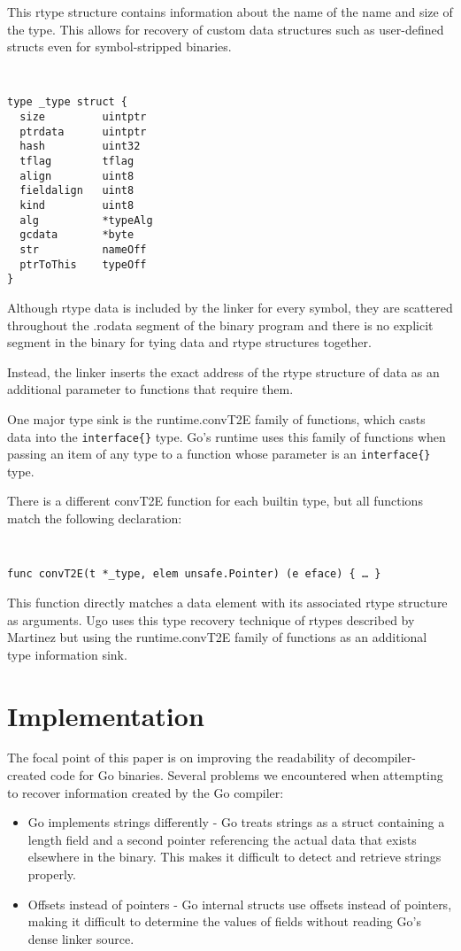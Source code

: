 \documentclass[letterpaper,twocolumn,10pt]{article}
\begin{document}
This rtype structure contains information about the name of the name and size of the type. This allows for recovery of custom data structures such as user-defined structs even for symbol-stripped binaries.
{\tt \small
\begin{verbatim}
type _type struct {
  size         uintptr
  ptrdata      uintptr
  hash         uint32
  tflag        tflag
  align        uint8
  fieldalign   uint8
  kind         uint8
  alg          *typeAlg
  gcdata       *byte
  str          nameOff
  ptrToThis    typeOff
}
\end{verbatim}
}

Although rtype data is included by the linker for every symbol, they are scattered throughout the .rodata segment of the binary program and there is no explicit segment in the binary for tying data and rtype structures together.

Instead, the linker inserts the exact address of the rtype structure of data as an additional parameter to functions that require them.

One major type sink is the runtime.convT2E family of functions, which casts data into the \texttt{interface\{\}} type. Go’s runtime uses this family of functions when passing an item of any type to a function whose parameter is an \texttt{interface\{\}} type.

    There is a different convT2E function for each builtin type, but all functions match the following declaration:

{\tt \small
\begin{verbatim}
func convT2E(t *_type, elem unsafe.Pointer) (e eface) { … }
\end{verbatim}
}

This function directly matches a data element with its associated rtype structure as arguments. Ugo uses this type recovery technique of rtypes described by Martinez \cite{martinez} but using the runtime.convT2E family of functions as an additional type information sink.

\section{Implementation}

The focal point of this paper is on improving the readability of decompiler-created code for Go binaries. Several problems we encountered when attempting to recover information created by the Go compiler:
\begin{itemize}
\item Go implements strings differently - Go treats strings as a struct containing a length field and a second pointer referencing the actual data that exists elsewhere in the binary. This makes it difficult to detect and retrieve strings properly.
\item Offsets instead of pointers - Go internal structs use offsets instead of pointers, making it difficult to determine the values of fields without reading Go’s dense linker source.
\end{itemize}
\end{document}
